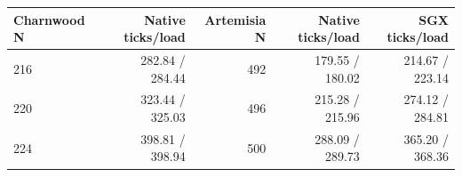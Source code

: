 \begin{tabular}{lrrrr}
\toprule
Charnwood N & Native ticks/load & Artemisia N & Native ticks/load & SGX ticks/load \\
\midrule
216 & 282.84 / 284.44 & 492 & 179.55 / 180.02 & 214.67 / 223.14 \\
220 & 323.44 / 325.03 & 496 & 215.28 / 215.96 & 274.12 / 284.81 \\
224 & 398.81 / 398.94 & 500 & 288.09 / 289.73 & 365.20 / 368.36 \\
\bottomrule
\end{tabular}
